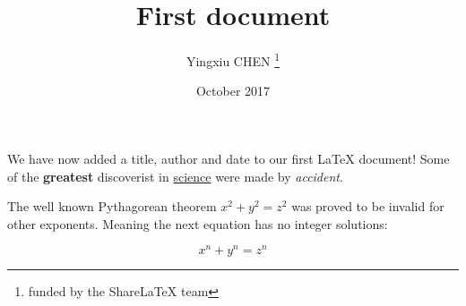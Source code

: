 \documentclass[12pt, a4paper, twoside]{article}
\title{First document}
\author{Yingxiu CHEN  \thanks{funded by the ShareLaTeX team}}
\date{October 2017}
\begin{document}
\maketitle

We have now added a title, author and date to our first \LaTeX{} document!
Some of the \textbf{greatest}
discoverist in \underline{science}
were made by \textit{accident}.

The well known Pythagorean theorem \(x^2 + y^2 = z^2\) was
proved to be invalid for other exponents.
Meaning the next equation has no integer solutions:

\[ x^n + y^n = z^n \]
\end{document}
